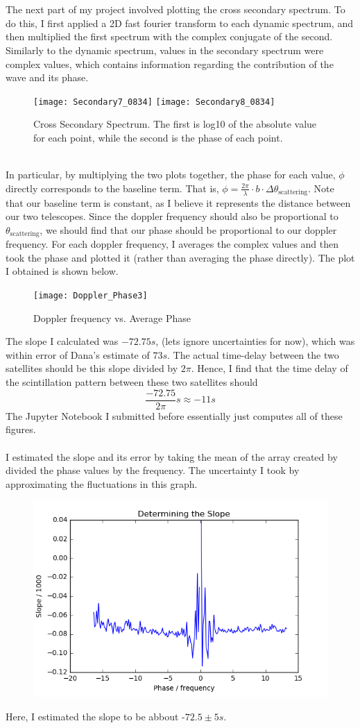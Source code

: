 \documentclass{article}
\begin{document}
\\
\\
The next part of my project involved plotting the cross secondary spectrum. To do this, I first applied a 2D fast fourier transform to each dynamic spectrum, and then multiplied the first spectrum with the complex conjugate of the second. Similarly to the dynamic spectrum, values in the secondary spectrum were complex values, which contains information regarding the contribution of the wave and its phase. 
\begin{figure}[h]
\texttt{[image: Secondary7\_0834]}
\texttt{[image: Secondary8\_0834]}
\centering
\caption{Cross Secondary Spectrum. The first is log10 of the absolute value for each point, while the second is the phase of each point.}
\centering
\end{figure}
\\
In particular, by multiplying the two plots together, the phase for each value, $\phi$ directly corresponds to the baseline term. That is, $\phi = \frac{2 \pi}{\lambda} \cdot b \cdot \Delta \theta_{\textrm{scattering}}$. Note that our baseline term is constant, as I believe it represents the distance between our two telescopes. Since the doppler frequency should also be proportional to $\theta_{\textrm{scattering}}$, we should find that our phase should be proportional to our doppler frequency. For each doppler frequency, I averages the complex values and then took the phase and plotted it (rather than averaging the phase directly). The plot I obtained is shown below. 
\begin{figure}[h]
\texttt{[image: Doppler\_Phase3]}
\centering
\caption{Doppler frequency vs. Average Phase}
\centering
\end{figure}
The slope I calculated was $-72.75 s$, (lets ignore uncertainties for now), which was within error of Dana's estimate of $73 s$. The actual time-delay between the two satellites should be this slope divided by $2 \pi$. Hence, I find that the time delay of the scintillation pattern between these two satellites should
$$
\frac{-72.75}{2 \pi} s \approx -11 s
$$
The Jupyter Notebook I submitted before essentially just computes all of these figures. 
\\
\\
I estimated the slope and its error by taking the mean of the array created by divided the phase values by the frequency. The uncertainty I took by approximating the fluctuations in this graph.
\begin{figure}[h]
\includegraphics[scale = 0.5]{slope}
\centering
\end{figure}
Here, I estimated the slope to be abbout -$72.5 \pm 5 s$.  
\end{document}
